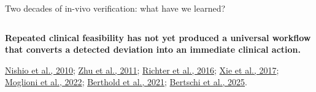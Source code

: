 \documentclass[aspectratio=169,11pt]{beamer}
\begin{document}
\begin{frame}{Two decades of in-vivo verification: what have we learned?}
\begin{center}
\begin{tabular}{@{}p{2.25cm} p{3.25cm} p{3.45cm} p{3.45cm}@{}}
\bottomrule
\end{tabular}
\end{center}

\begin{center}
{\footnotesize\bfseries\color{darkred}
Repeated clinical feasibility has not yet produced a universal workflow
that converts a detected deviation into an immediate clinical action.
}
\end{center}

\vspace{0.18cm}

{\tiny\color{gray}
\href{https://doi.org/10.1016/j.ijrobp.2009.05.065}
{Nishio et al., 2010};
\href{https://doi.org/10.1088/0031-9155/56/13/019}
{Zhu et al., 2011};
\href{https://doi.org/10.1016/j.radonc.2016.01.004}
{Richter et al., 2016};
\href{https://pubmed.ncbi.nlm.nih.gov/28816148/}
{Xie et al., 2017};
\href{https://doi.org/10.3389/fonc.2022.929949}
{Moglioni et al., 2022};
\href{https://pubmed.ncbi.nlm.nih.gov/34229052/}
{Berthold et al., 2021};
\href{https://pmc.ncbi.nlm.nih.gov/articles/PMC12630069/}
{Bertschi et al., 2025}.
}

\end{frame}
\end{document}
